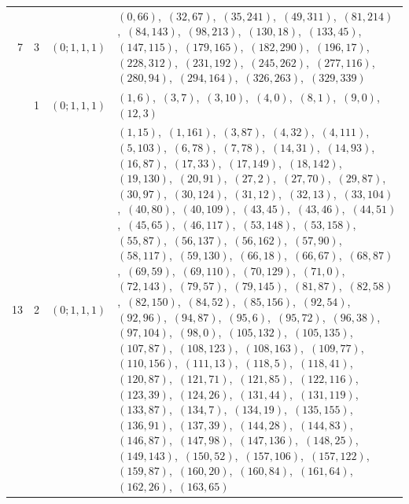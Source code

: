 \documentclass[11pt]{article}
\begin{document}
\begin{longtable}{@{}rrl>{\raggedright\arraybackslash}p{}@{}}
7 & 3 & $(0;1,1,1)$ & $(0,66)$,\allowbreak\ $(32,67)$,\allowbreak\ $(35,241)$,\allowbreak\ $(49,311)$,\allowbreak\ $(81,214)$,\allowbreak\ $(84,143)$,\allowbreak\ $(98,213)$,\allowbreak\ $(130,18)$,\allowbreak\ $(133,45)$,\allowbreak\ $(147,115)$,\allowbreak\ $(179,165)$,\allowbreak\ $(182,290)$,\allowbreak\ $(196,17)$,\allowbreak\ $(228,312)$,\allowbreak\ $(231,192)$,\allowbreak\ $(245,262)$,\allowbreak\ $(277,116)$,\allowbreak\ $(280,94)$,\allowbreak\ $(294,164)$,\allowbreak\ $(326,263)$,\allowbreak\ $(329,339)$\\
\addlinespace[3pt]
13 & 1 & $(0;1,1,1)$ & $(1,6)$,\allowbreak\ $(3,7)$,\allowbreak\ $(3,10)$,\allowbreak\ $(4,0)$,\allowbreak\ $(8,1)$,\allowbreak\ $(9,0)$,\allowbreak\ $(12,3)$\\
13 & 2 & $(0;1,1,1)$ & $(1,15)$,\allowbreak\ $(1,161)$,\allowbreak\ $(3,87)$,\allowbreak\ $(4,32)$,\allowbreak\ $(4,111)$,\allowbreak\ $(5,103)$,\allowbreak\ $(6,78)$,\allowbreak\ $(7,78)$,\allowbreak\ $(14,31)$,\allowbreak\ $(14,93)$,\allowbreak\ $(16,87)$,\allowbreak\ $(17,33)$,\allowbreak\ $(17,149)$,\allowbreak\ $(18,142)$,\allowbreak\ $(19,130)$,\allowbreak\ $(20,91)$,\allowbreak\ $(27,2)$,\allowbreak\ $(27,70)$,\allowbreak\ $(29,87)$,\allowbreak\ $(30,97)$,\allowbreak\ $(30,124)$,\allowbreak\ $(31,12)$,\allowbreak\ $(32,13)$,\allowbreak\ $(33,104)$,\allowbreak\ $(40,80)$,\allowbreak\ $(40,109)$,\allowbreak\ $(43,45)$,\allowbreak\ $(43,46)$,\allowbreak\ $(44,51)$,\allowbreak\ $(45,65)$,\allowbreak\ $(46,117)$,\allowbreak\ $(53,148)$,\allowbreak\ $(53,158)$,\allowbreak\ $(55,87)$,\allowbreak\ $(56,137)$,\allowbreak\ $(56,162)$,\allowbreak\ $(57,90)$,\allowbreak\ $(58,117)$,\allowbreak\ $(59,130)$,\allowbreak\ $(66,18)$,\allowbreak\ $(66,67)$,\allowbreak\ $(68,87)$,\allowbreak\ $(69,59)$,\allowbreak\ $(69,110)$,\allowbreak\ $(70,129)$,\allowbreak\ $(71,0)$,\allowbreak\ $(72,143)$,\allowbreak\ $(79,57)$,\allowbreak\ $(79,145)$,\allowbreak\ $(81,87)$,\allowbreak\ $(82,58)$,\allowbreak\ $(82,150)$,\allowbreak\ $(84,52)$,\allowbreak\ $(85,156)$,\allowbreak\ $(92,54)$,\allowbreak\ $(92,96)$,\allowbreak\ $(94,87)$,\allowbreak\ $(95,6)$,\allowbreak\ $(95,72)$,\allowbreak\ $(96,38)$,\allowbreak\ $(97,104)$,\allowbreak\ $(98,0)$,\allowbreak\ $(105,132)$,\allowbreak\ $(105,135)$,\allowbreak\ $(107,87)$,\allowbreak\ $(108,123)$,\allowbreak\ $(108,163)$,\allowbreak\ $(109,77)$,\allowbreak\ $(110,156)$,\allowbreak\ $(111,13)$,\allowbreak\ $(118,5)$,\allowbreak\ $(118,41)$,\allowbreak\ $(120,87)$,\allowbreak\ $(121,71)$,\allowbreak\ $(121,85)$,\allowbreak\ $(122,116)$,\allowbreak\ $(123,39)$,\allowbreak\ $(124,26)$,\allowbreak\ $(131,44)$,\allowbreak\ $(131,119)$,\allowbreak\ $(133,87)$,\allowbreak\ $(134,7)$,\allowbreak\ $(134,19)$,\allowbreak\ $(135,155)$,\allowbreak\ $(136,91)$,\allowbreak\ $(137,39)$,\allowbreak\ $(144,28)$,\allowbreak\ $(144,83)$,\allowbreak\ $(146,87)$,\allowbreak\ $(147,98)$,\allowbreak\ $(147,136)$,\allowbreak\ $(148,25)$,\allowbreak\ $(149,143)$,\allowbreak\ $(150,52)$,\allowbreak\ $(157,106)$,\allowbreak\ $(157,122)$,\allowbreak\ $(159,87)$,\allowbreak\ $(160,20)$,\allowbreak\ $(160,84)$,\allowbreak\ $(161,64)$,\allowbreak\ $(162,26)$,\allowbreak\ $(163,65)$\\

\end{longtable}
\end{document}
